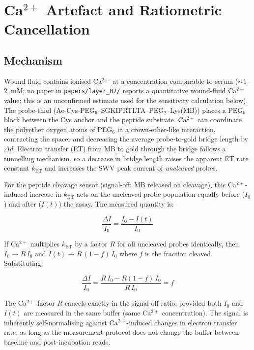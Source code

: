 \documentclass[10pt,a4paper]{article}
\numberwithin{equation}{section}
\begin{document}
\section{Ca$^{2+}$ Artefact and Ratiometric Cancellation}
\label{sec:calcium}

\subsection{Mechanism}

Wound fluid contains ionised Ca$^{2+}$ at a concentration comparable to serum
($\sim$1--2~mM; no paper in \texttt{papers/layer\_07/} reports a quantitative
wound-fluid Ca$^{2+}$ value: this is an unconfirmed estimate used for the sensitivity
calculation below).
The probe-thiol (Ac-Cys-PEG$_6$--SGKIPRTLTA--PEG$_2$--Lys(MB)) places a PEG$_6$
block between the Cys anchor and the peptide substrate. Ca$^{2+}$ can coordinate the
polyether oxygen atoms of PEG$_6$ in a crown-ether-like interaction, contracting the
spacer and decreasing the average probe-to-gold bridge length by $\Delta d$. Electron transfer (ET) from MB to gold through the bridge follows a
tunnelling mechanism, so a decrease in bridge length raises the apparent ET rate
constant $k_{\mathrm{ET}}$ and increases the SWV peak current of \emph{uncleaved}
probes.

For the peptide cleavage sensor (signal-off: MB released on cleavage), this
Ca$^{2+}$-induced increase in $k_{\mathrm{ET}}$ acts on the uncleaved probe population
equally before ($I_0$) and after ($I(t)$) the assay. The measured quantity is:

\begin{equation}
  \frac{\Delta I}{I_0} = \frac{I_0 - I(t)}{I_0}
  \label{eq:signal_off_ca}
\end{equation}

If Ca$^{2+}$ multiplies $k_{\mathrm{ET}}$ by a factor $R$ for all uncleaved probes
identically, then $I_0 \to R\,I_0$ and $I(t) \to R\,(1-f)\,I_0$ where $f$ is the
fraction cleaved. Substituting:

\begin{equation}
  \frac{\Delta I}{I_0} = \frac{R\,I_0 - R(1-f)\,I_0}{R\,I_0} = f
  \label{eq:ca_cancel}
\end{equation}

The Ca$^{2+}$ factor $R$ cancels exactly in the signal-off ratio, provided both $I_0$
and $I(t)$ are measured in the same buffer (same Ca$^{2+}$ concentration). The signal
is inherently self-normalising against Ca$^{2+}$-induced changes in electron transfer
rate, as long as the measurement protocol does not change the buffer between baseline
and post-incubation reads.
\end{document}
